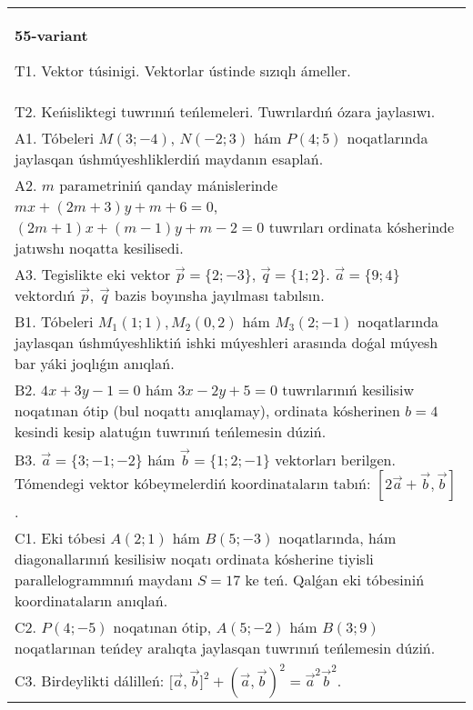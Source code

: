 \documentclass{article}
\begin{document}
    
    \begin{tabular}{m{17cm}}
    \textbf{55-variant}
    \newline
    
    T1. 
    Vektor túsinigi. Vektorlar ústinde sızıqlı ámeller.
     \\
    T2. 
    Keńisliktegi tuwrınıń teńlemeleri. Tuwrılardıń ózara jaylasıwı.
     \\
    A1. 
    Tóbeleri $M(3;-4)$, $N(-2;3)$ hám $P(4;5)$ 
    noqatlarında jaylasqan úshmúyeshliklerdiń maydanın esaplań.
     \\
    A2. 
    $m$ parametriniń qanday mánislerinde 
    $mx+(2m+3)y+m+6=0$, $(2m+1)x+(m-1)y+m-2=0$ tuwrıları ordinata
    kósherinde jatıwshı noqatta kesilisedi.
     \\
    A3. 
    Tegislikte eki vektor
    $\overrightarrow{p} = \{ 2; - 3\}$, $\overrightarrow{q} = \{ 1;2\}$.
    $\overrightarrow{a} = \{9;4\}$ vektordıń
    $\overrightarrow{p},\ \overrightarrow{q}$ bazis boyınsha jayılması tabılsın.
     \\
    B1. 
    Tóbeleri \(M_{1}(1;1), M_{2}(0,2)\) hám
    \(M_{3}(2;-1)\) noqatlarında jaylasqan úshmúyeshliktiń ishki
    múyeshleri arasında doǵal múyesh bar yáki joqlıǵın anıqlań.
     \\
    B2. 
    \(4x+3y-1=0\) hám \(3x-2y+5=0\)
    tuwrılarınıń kesilisiw noqatınan ótip (bul noqattı anıqlamay), ordinata
    kósherinen \(b=4\) kesindi kesip alatuǵın tuwrınıń teńlemesin dúziń.
     \\
    B3. 
    $\vec{a} = \{ 3; - 1; - 2\}$ hám $\vec{b} = \{ 1;2; - 1\}$ vektorları berilgen. Tómendegi vektor kóbeymelerdiń koordinataların tabıń: 
    $\left\lbrack 2\vec{a} + \vec{b},\vec{b} \right\rbrack$.
     \\
    C1. 
    Eki tóbesi \(A(2;1)\) hám \(B(5; - 3)\) noqatlarında, hám
    diagonallarınıń kesilisiw noqatı ordinata kósherine tiyisli
    parallelogrammnıń maydanı \(S = 17\) ke teń. Qalǵan eki tóbesiniń
    koordinataların anıqlań. \\
    C2. 
    \(P(4; - 5)\) noqatınan ótip,
    \(A(5; - 2)\) hám \(B(3;9)\) noqatlarınan teńdey aralıqta jaylasqan
    tuwrınıń teńlemesin dúziń.
     \\
    C3. 
    Birdeylikti dálilleń: \(\lbrack\vec{a},\vec{b}\rbrack^{2} + (\vec{a},\vec{b}) ^{2} = {\vec{a}}^{2}{\vec{b}}^{2}\).
     \\
    
    \end{tabular}
    \vspace{1cm}
    
\end{document}
